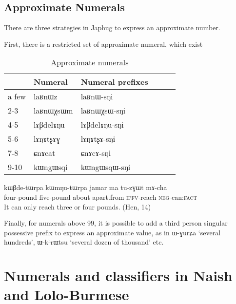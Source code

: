\documentclass[oldfontcommands,oneside,a4paper,12pt]{article}
\newcommand{\ipa}[1]{{\phon#1}}
\begin{document}
 \subsection{Approximate Numerals}
There are three strategies in Japhug to express an approximate number.

First, there is a restricted set of approximate numeral, which exist 
\begin{table}[h]
\caption{Approximate numerals} \label{tab:approx.num} \centering
\begin{tabular}{llllll}
\toprule
&Numeral &Numeral prefixes \\
\midrule
a few &\ipa{laʁnɯz}  & 	\ipa{ laʁnɯ-sŋi}  & 	\\	
2-3&\ipa{laʁnɯχsɯm}  & 	\ipa{laʁnɯχsɯ-sŋi}  & 	\\	
4-5&\ipa{lɤβdelɤŋu}  & 	\ipa{lɤβdelɤŋu-sŋi}  & 	\\	
5-6&\ipa{lɤŋɤtʂɤɣ}  & 	\ipa{lɤŋɤtʂɤ-sŋi}  & 	\\	
7-8&\ipa{ɕnɤcat}  & 	\ipa{ɕnɤcɤ-sŋi }  & 	\\	
9-10&\ipa{kɯngɯsqi}  & 	\ipa{kɯngɯsqɯ-sŋi}  & 	\\	
\bottomrule
\end{tabular}
\end{table}

%
% 
 
 
 \begin{exe}
\ex \label{ex:kWBde.tWrpa}
\gll 
\ipa{kɯβde-tɯrpa} 	\ipa{kɯmŋu-tɯrpa} 	\ipa{jamar} 	\ipa{ma} 	\ipa{tu-zɣɯt} 	\ipa{mɤ-cha} \\
four-pound five-pound about apart.from \textsc{ipfv}-reach \textsc{neg}-can:\textsc{fact} \\
\glt It can only reach three or four pounds. (Hen, 14)
\end{exe}


Finally, for numerals above 99, it is possible to add a third person singular possessive prefix to  express an approximate value, as in  \ipa{ɯ-ɣurʑa} `several hundreds', \ipa{ɯ-kʰrɯtsu} `several dozen of thousand' etc.


\section{Numerals and classifiers in Naish and Lolo-Burmese}



\end{document}
